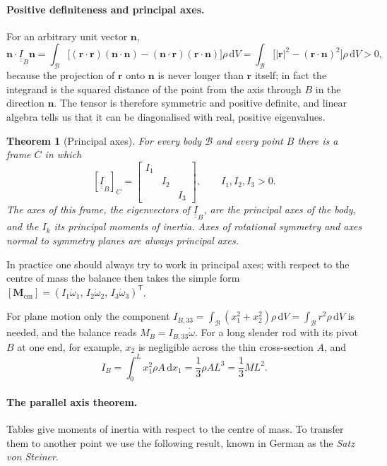 \documentclass[11pt,a4paper,oneside]{report}
\numberwithin{equation}{chapter}
\newcommand{\vect}[1]{\bm{#1}}
\newcommand{\tens}[1]{\underline{\underline{#1}}}
\newcommand{\dd}{\,\mathrm{d}}
\newcommand{\cm}{\mathrm{cm}}
\theoremstyle{plain}
\newtheorem{theorem}{Theorem}[chapter]
\theoremstyle{definition}
\theoremstyle{remark}
\begin{document}
\paragraph{Positive definiteness and principal axes.}
For an arbitrary unit vector $\vect n$,
\[
  \vect n\cdot\tens I_B\vect n=\int_{\mathcal B}\big[(\vect r\cdot\vect r)(\vect n\cdot\vect n)-(\vect n\cdot\vect r)(\vect r\cdot\vect n)\big]\rho\dd V
  =\int_{\mathcal B}\big[|\vect r|^2-(\vect r\cdot\vect n)^2\big]\rho\dd V>0 ,
\]
because the projection of $\vect r$ onto $\vect n$ is never longer than $\vect r$ itself; in fact the integrand is the
squared distance of the point from the axis through $B$ in the direction $\vect n$. The tensor is therefore symmetric and
positive definite, and linear algebra tells us that it can be diagonalised with real, positive eigenvalues.

\begin{theorem}[Principal axes]
For every body $\mathcal B$ and every point $B$ there is a frame $C$ in which
\[
  [\tens I_B]_C=\begin{bmatrix}I_1&&\\&I_2&\\&&I_3\end{bmatrix},\qquad I_1,I_2,I_3>0 .
\]
The axes of this frame, the eigenvectors of $\tens I_B$, are the \emph{principal axes} of the body, and the
$I_k$ its principal moments of inertia. Axes of rotational symmetry and axes normal to symmetry planes are always
principal axes.
\end{theorem}
In practice one should always try to work in principal axes; with respect to the centre of mass the balance then
takes the simple form $[\vect M_\cm]=(I_1\dot\omega_1,\,I_2\dot\omega_2,\,I_3\dot\omega_3)^{\mathsf T}$.

For plane motion only the component $I_{B,33}=\int_{\mathcal B}(x_1^2+x_2^2)\rho\dd V=\int_{\mathcal B}r^2\rho\dd V$ is
needed, and the balance reads $M_B=I_{B,33}\dot\omega$. For a long slender rod with its pivot $B$ at one end, for
example, $x_2$ is negligible across the thin cross-section $A$, and
\[
  I_B=\int_0^Lx_1^2\rho A\dd x_1=\frac13\rho AL^3=\frac13ML^2 .
\]

\paragraph{The parallel axis theorem.}
Tables give moments of inertia with respect to the centre of mass. To transfer them to another point we use the
following result, known in German as the \emph{Satz von Steiner}.
\end{document}

